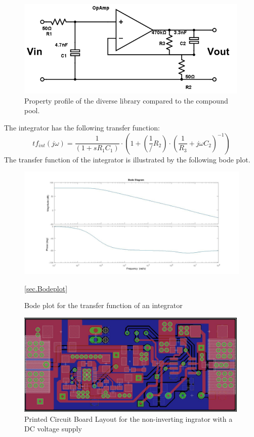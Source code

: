 \begin{figure}
\includegraphics[width=0.99\textwidth]{figures/Method/integrator/circuit.png}
    \caption{Property profile of the diverse library compared to the compound pool.}
    \label{fig.circuit}
    \end{figure}	


The integrator has the following transfer function: \\
\begin{equation}
	tf_{int}(j \omega)=\frac{1}{(1+s R_1 C_1)}\cdot(1+(\frac{1}/{R_2})\cdot(\frac{1}{R_3}+j \omega C_2)^{-1})
\end{equation}
The transfer function of the integrator is illustrated by the following bode plot. 

\begin{figure}

\includegraphics[width=\textwidth]{figures/Method/integrator/transferfunction_int.jpg}

\caption[Kurze Abbildungsbeschreibung]{Bode plot for the transfer function of an integrator } \ref{sec.Bodeplot}
\end{figure}

\begin{figure}
\includegraphics[width=0.99\textwidth]{figures/Method/integrator/PCB_Integrator.png}
    \caption{Printed Circuit Board Layout for the non-inverting ingrator with a DC voltage supply}
    
    \end{figure}	
    
